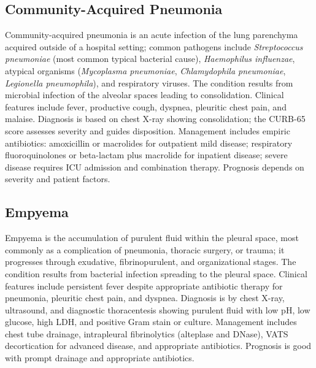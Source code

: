 \subsection{Community-Acquired Pneumonia}
\label{sec:Community-Acquired Pneumonia}
Community-acquired pneumonia is an acute infection of the lung parenchyma acquired outside of a hospital setting; common pathogens include \textit{Streptococcus pneumoniae} (most common typical bacterial cause), \textit{Haemophilus influenzae}, atypical organisms (\textit{Mycoplasma pneumoniae}, \textit{Chlamydophila pneumoniae}, \textit{Legionella pneumophila}), and respiratory viruses. The condition results from microbial infection of the alveolar spaces leading to consolidation. Clinical features include fever, productive cough, dyspnea, pleuritic chest pain, and malaise. Diagnosis is based on chest X-ray showing consolidation; the CURB-65 score assesses severity and guides disposition. Management includes empiric antibiotics: amoxicillin or macrolides for outpatient mild disease; respiratory fluoroquinolones or beta-lactam plus macrolide for inpatient disease; severe disease requires ICU admission and combination therapy. Prognosis depends on severity and patient factors.

\subsection{Empyema}
\label{sec:Empyema}
Empyema is the accumulation of purulent fluid within the pleural space, most commonly as a complication of pneumonia, thoracic surgery, or trauma; it progresses through exudative, fibrinopurulent, and organizational stages. The condition results from bacterial infection spreading to the pleural space. Clinical features include persistent fever despite appropriate antibiotic therapy for pneumonia, pleuritic chest pain, and dyspnea. Diagnosis is by chest X-ray, ultrasound, and diagnostic thoracentesis showing purulent fluid with low pH, low glucose, high LDH, and positive Gram stain or culture. Management includes chest tube drainage, intrapleural fibrinolytics (alteplase and DNase), VATS decortication for advanced disease, and appropriate antibiotics. Prognosis is good with prompt drainage and appropriate antibiotics.

